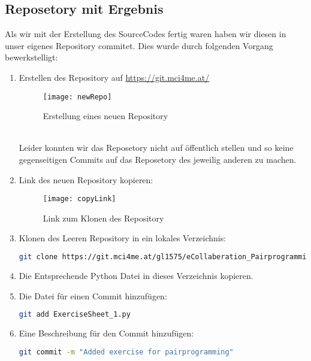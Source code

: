\documentclass[12pt]{article}
\begin{document}
\subsection{Reposetory mit Ergebnis}
Als wir mit der Erstellung des SourceCodes fertig waren haben wir diesen in unser eigenes Repository commitet. Dies wurde durch folgenden Vorgang bewerkstelligt:
\begin{enumerate}
 \item Erstellen des Repository auf \url{https://git.mci4me.at/}
 \begin{figure}[h]
  \begin{center}
   \texttt{[image: newRepo]}
   \caption{Erstellung eines neuen Repository}
  \end{center}
 \end{figure}\\
 Leider konnten wir das Reposetory nicht auf öffentlich stellen und so keine gegenseitigen Commits auf das Reposetory des jeweilig anderen zu machen.
 \item Link des neuen Repository kopieren:
 \begin{figure}[h]
  \begin{center}
   \texttt{[image: copyLink]}
   \caption{Link zum Klonen des Repository}
  \end{center}
 \end{figure}
 \item Klonen des Leeren Repository in ein lokales Verzeichnis:
 \begin{lstlisting}[caption={CLI Kommando zum Klonen eines Repository},language=Bash,frame=single]
  git clone https://git.mci4me.at/gl1575/eCollaberation_Pairprogramming.git
 \end{lstlisting}
  \item Die Entsprechende Python Datei in dieses Verzeichnis kopieren.
  \item Die Datei für einen Commit hinzufügen:
  \begin{lstlisting}[caption={CLI Kommando zum Hinzufügen einer Datei für einen Commit},language=Bash,frame=single]
  git add ExerciseSheet_1.py
 \end{lstlisting}
 \item Eine Beschreibung für den Commit hinzufügen:
 \begin{lstlisting}[caption={CLI Kommando zum Hinzufügen einer Beschreibung für einen Commit},language=Bash,frame=single]
  git commit -m "Added exercise for pairprogramming"
 \end{lstlisting}

\end{enumerate}
\end{document}
